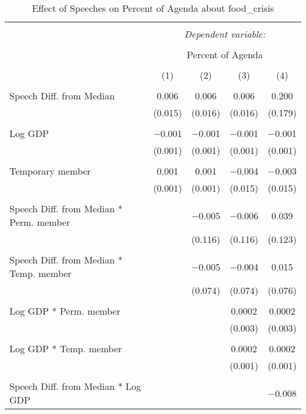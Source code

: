 
\begin{table}[!htbp] \centering 
  \caption{Effect of Speeches on Percent of Agenda about food_crisis} 
  \label{} 
\begin{tabular}{@{\extracolsep{5pt}}lcccc} 
\\[-1.8ex]\hline 
\hline \\[-1.8ex] 
 & \multicolumn{4}{c}{\textit{Dependent variable:}} \\ 
\cline{2-5} 
\\[-1.8ex] & \multicolumn{4}{c}{Percent of Agenda} \\ 
\\[-1.8ex] & (1) & (2) & (3) & (4)\\ 
\hline \\[-1.8ex] 
 Speech Diff. from Median & 0.006 & 0.006 & 0.006 & 0.200 \\ 
  & (0.015) & (0.016) & (0.016) & (0.179) \\ 
  & & & & \\ 
 Log GDP & $-$0.001 & $-$0.001 & $-$0.001 & $-$0.001 \\ 
  & (0.001) & (0.001) & (0.001) & (0.001) \\ 
  & & & & \\ 
 Temporary member & 0.001 & 0.001 & $-$0.004 & $-$0.003 \\ 
  & (0.001) & (0.001) & (0.015) & (0.015) \\ 
  & & & & \\ 
 Speech Diff. from Median * Perm. member &  & $-$0.005 & $-$0.006 & 0.039 \\ 
  &  & (0.116) & (0.116) & (0.123) \\ 
  & & & & \\ 
 Speech Diff. from Median * Temp. member &  & $-$0.005 & $-$0.004 & 0.015 \\ 
  &  & (0.074) & (0.074) & (0.076) \\ 
  & & & & \\ 
 Log GDP * Perm. member &  &  & 0.0002 & 0.0002 \\ 
  &  &  & (0.003) & (0.003) \\ 
  & & & & \\ 
 Log GDP * Temp. member &  &  & 0.0002 & 0.0002 \\ 
  &  &  & (0.001) & (0.001) \\ 
  & & & & \\ 
 Speech Diff. from Median * Log GDP &  &  &  & $-$0.008 \\ 

\end{tabular}
\end{table}

